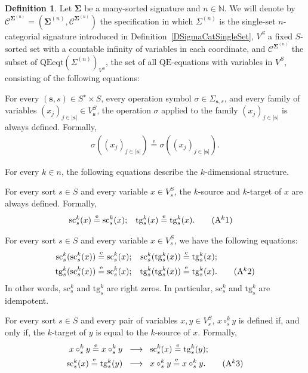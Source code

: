 \documentclass[a4paper, reqno
]{amsart}
\newcommand{\sig}[1]{\mathbf{#1}}             %
\newcommand{\spec}[1]{\boldsymbol{\mathcal{#1}}} %
\newcommand{\eeq}{\overset{\mathrm e}{=}}      %
\newcommand{\QE}{\mathrm{QE}}
\newcommand{\src}{\mathrm{sc}}
\newcommand{\tgt}{\mathrm{tg}}
\theoremstyle{plain}
\theoremstyle{definition}
\newtheorem{definition}[theorem]{Definition}
\begin{document}
\begin{definition}\label{DSpecSingleSet}
Let $\sig{\Sigma}$ be a many-sorted signature and $n\in\mathbb{N}$.
We will denote by $\spec{C}^{\sig{\Sigma}^{(n)}}=(\sig{\Sigma}^{(n)},\mathcal{C}^{\sig{\Sigma}^{(n)}})$ the specification in which $\Sigma^{(n)}$ is the single-set $n$-categorial signature introduced in Definition~\ref{DSigmaCatSingleSet}, $V^{S}$ a fixed $S$-sorted set with a countable infinity of variables in each coordinate, and $\mathcal{C}^{\sig{\Sigma}^{(n)}}$ the subset of $\mathrm{QEeqt}(\Sigma^{(n)})_{V^{S}}$, the set of all $\QE$-equations with variables in $V^{S}$, consisting of the following equations:

For every $(\mathbf{s},s)\in S^{\star}\times S$, every operation symbol $\sigma\in \Sigma_{\mathbf{s},s}$, and every family of variables $(x_{j})_{j\in \lvert\mathbf{s}\rvert}\in V^{S}_{\mathbf{s}}$, the operation $\sigma$ applied to the family $(x_{j})_{j\in \lvert\mathbf{s}\rvert}$ is always defined.
Formally,
\begin{align*}
\sigma((x_{j})_{j\in \lvert\mathbf{s}\rvert})\eeq\sigma((x_{j})_{j\in \lvert\mathbf{s}\rvert}).\label{ASingleSetA0}\tag{A0}
\end{align*}

For every $k\in n$, the following equations describe the $k$-dimensional structure.

For every sort $s\in S$ and every variable $x\in V^{S}_{s}$, the $k$-source and $k$-target of $x$ are always defined.
Formally,
\begin{align*}
\src^{k}_{s}(x)&\eeq\src^{k}_{s}(x);
&
\tgt^{k}_{s}(x)&\eeq\tgt^{k}_{s}(x).\label{ASingleSetAk1}\tag{A$^{k}$1}
\end{align*}

For every sort $s\in S$ and every variable $x\in V^{S}_{s}$, we have the following equations:
\begin{align*}
\src^{k}_{s}(\src^{k}_{s}(x))&\eeq\src^{k}_{s}(x);
&
\src^{k}_{s}(\tgt^{k}_{s}(x))&\eeq\tgt^{k}_{s}(x);\\
\tgt^{k}_{s}(\src^{k}_{s}(x))&\eeq\src^{k}_{s}(x);
&
\tgt^{k}_{s}(\tgt^{k}_{s}(x))&\eeq\tgt^{k}_{s}(x).\label{ASingleSetAk2}\tag{A$^{k}$2}
\end{align*}
In other words, $\src^{k}_{s}$ and $\tgt^{k}_{s}$ are right zeros.
In particular, $\src^{k}_{s}$ and $\tgt^{k}_{s}$ are idempotent.

For every sort $s\in S$ and every pair of variables $x,y\in V^{S}_{s}$, $x\circ^{k}_{s} y$ is defined if, and only if, the $k$-target of $y$ is equal to the $k$-source of $x$.
Formally,
\begin{align*}
x\circ^{k}_{s} y\eeq x\circ^{k}_{s} y \;\;
&\longrightarrow \;\;
\src^{k}_{s}(x)\eeq\tgt^{k}_{s}(y);\\
\src^{k}_{s}(x)\eeq\tgt^{k}_{s}(y) \;\;
&\longrightarrow \;\;
x\circ^{k}_{s} y\eeq x\circ^{k}_{s}y.\label{ASingleSetAk3}\tag{A$^{k}$3}
\end{align*}


\end{definition}
\end{document}
